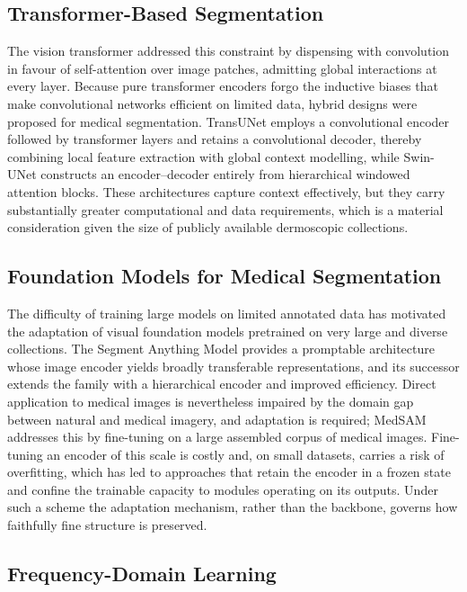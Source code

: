 \subsection{Transformer-Based Segmentation}

The vision transformer \cite{ref7} addressed this constraint by dispensing with convolution in favour of self-attention over image patches, admitting global interactions at every layer. Because pure transformer encoders forgo the inductive biases that make convolutional networks efficient on limited data, hybrid designs were proposed for medical segmentation. TransUNet \cite{ref8} employs a convolutional encoder followed by transformer layers and retains a convolutional decoder, thereby combining local feature extraction with global context modelling, while Swin-UNet \cite{ref18} constructs an encoder--decoder entirely from hierarchical windowed attention blocks. These architectures capture context effectively, but they carry substantially greater computational and data requirements, which is a material consideration given the size of publicly available dermoscopic collections.

\subsection{Foundation Models for Medical Segmentation}

The difficulty of training large models on limited annotated data has motivated the adaptation of visual foundation models pretrained on very large and diverse collections. The Segment Anything Model \cite{ref9} provides a promptable architecture whose image encoder yields broadly transferable representations, and its successor \cite{ref10} extends the family with a hierarchical encoder and improved efficiency. Direct application to medical images is nevertheless impaired by the domain gap between natural and medical imagery, and adaptation is required; MedSAM \cite{ref11} addresses this by fine-tuning on a large assembled corpus of medical images. Fine-tuning an encoder of this scale is costly and, on small datasets, carries a risk of overfitting, which has led to approaches that retain the encoder in a frozen state and confine the trainable capacity to modules operating on its outputs. Under such a scheme the adaptation mechanism, rather than the backbone, governs how faithfully fine structure is preserved.

\subsection{Frequency-Domain Learning}

